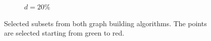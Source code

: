 \begin{figure}[H]
\begin{subfigure}[b]{0.24\linewidth}
  	\caption{\small $d=20\%$} 
  	\label{fig:20_sweden} 
  	\vspace{4ex}
  \end{subfigure}
  \caption[Selected subsets from both graph building algorithms]{Selected subsets from both graph building algorithms. The points are selected starting from green to red.}
  \label{fig:sweden_dist} 
\end{figure}

